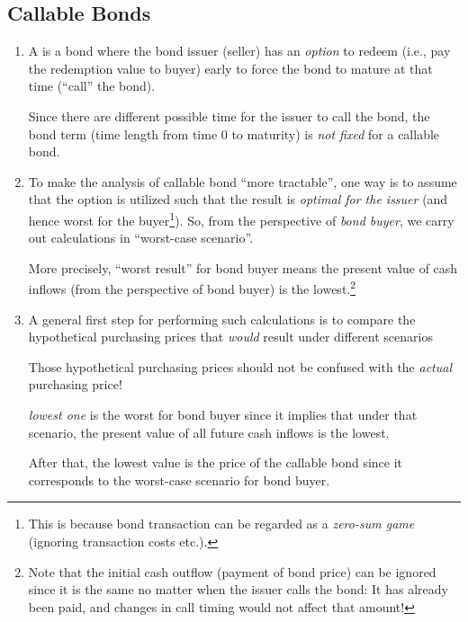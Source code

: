 \subsection{Callable Bonds}
\label{subsect:callable-bonds}
\begin{enumerate}
\item A  is a bond where the bond issuer (seller) has an
\emph{option} to redeem (i.e., pay the redemption value to buyer) early to
force the bond to mature at that time (``call'' the bond).

\begin{note}
Since there are different possible time for the issuer to call the bond, the
bond term (time length from time 0 to maturity) is \emph{not fixed} for a
callable bond.
\end{note}

\item To make the analysis of callable bond ``more tractable'', one way is to
assume that the option is utilized such that the result is \emph{optimal for
the issuer} (and hence worst for the buyer\footnote{This is because bond
transaction can be regarded as a \emph{zero-sum game} (ignoring transaction
costs etc.).}). So, from the perspective of \emph{bond buyer}, we carry out
calculations in ``worst-case scenario''.

\begin{note}
More precisely, ``worst result'' for bond buyer means the present value of cash
inflows (from the perspective of bond buyer) is the lowest.\footnote{Note that
the initial cash outflow (payment of bond price) can be ignored since it is the
same no matter when the issuer calls the bond: It has already been paid, and
changes in call timing would not affect that amount!}
\end{note}

\item \label{it:callable-bond-price}
A general first step for performing such calculations is to compare the
hypothetical purchasing prices that \emph{would} result under different
scenarios \begin{warning} Those hypothetical purchasing prices should not be
confused with the \emph{actual} purchasing price! \end{warning}
 \emph{lowest one} is the worst for bond buyer since it
implies that under that scenario, the present value of all future cash inflows
is the lowest.

After that, the lowest value is the price of the callable bond since it
corresponds to the worst-case scenario for bond buyer.
\end{enumerate}
